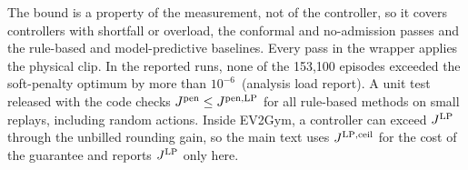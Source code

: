The bound is a property of the measurement, not of the controller, so it covers controllers with shortfall or overload, the conformal and no-admission passes and the rule-based and model-predictive baselines.
Every pass in the wrapper applies the physical clip.
In the reported runs, none of the 153,100 episodes exceeded the soft-penalty optimum by more than $10^{-6}$\,\texteuro{} (analysis load report).
A unit test released with the code checks $J^{\mathrm{pen}}\le J^{\mathrm{pen,LP}}$ for all rule-based methods on small replays, including random actions.
Inside EV2Gym, a controller can exceed $J^{\mathrm{LP}}$ through the unbilled rounding gain, so the main text uses $J^{\mathrm{LP,ceil}}$ for the cost of the guarantee and reports $J^{\mathrm{LP}}$ only here.
